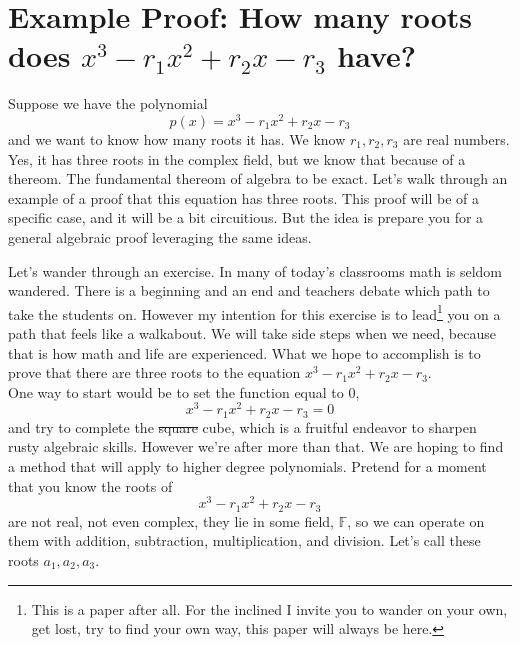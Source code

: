 \documentclass[12pt]{article}
\begin{document}




\section*{Example Proof: How many roots does $x^3 -r_1 x^2 +r_2 x - r_3$ have?}
Suppose we have the polynomial $$p(x) = x^3 -r_1 x^2 +r_2 x - r_3$$ and we want to know how many roots it has.  We know $r_1, r_2, r_3$ are real numbers.  Yes, it has three roots in the complex field, but we know that because of a thereom.  The fundamental thereom of algebra to be exact.  Let's walk through an example of a proof that this equation has three roots.  This proof will be of a specific case, and it will be a bit circuitious.  But the idea is prepare you for a general algebraic proof leveraging the same ideas.

Let's wander through an exercise.  In many of today's classrooms math is seldom wandered.  There is a beginning and an end and teachers debate which path to take the students on.  However my intention for this exercise is to lead\footnote{This is a paper after all.  For the inclined I invite you to wander on your own, get lost, try to find your own way, this paper will always be here.} you on a path that feels like a walkabout.  We will take side steps when we need, because that is how math and life are experienced.  What we hope to accomplish is to prove that there are three roots to the equation $x^3 -r_1 x^2 +r_2 x - r_3$.\\

One way to start would be to set the function equal to 0,  $$x^3 -r_1 x^2 +r_2 x - r_3 =0$$ and try to complete the \sout{square} cube,  which is a fruitful endeavor to sharpen rusty algebraic skills.  However we're after more than that.  We are hoping to find a method that will apply to higher degree polynomials.  Pretend for a moment that you know the roots of  $$x^3 -r_1 x^2 +r_2 x - r_3$$ are not real, not even complex, they lie in some field, $\mathbb{F}$, so we can operate on them with addition, subtraction, multiplication, and division.  Let's call these roots $a_1, a_2, a_3$.  
\end{document}
